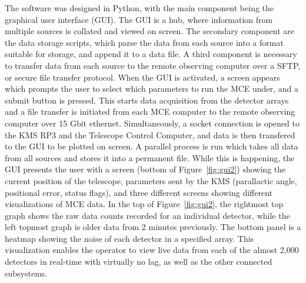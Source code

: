 \documentclass[manuscript]{aastex}
\begin{document}
The software was designed in {\sc Python}, with the main component being the graphical user interface (GUI). The GUI is a hub, where information from multiple sources is collated and viewed on screen. The secondary component are the data storage scripts, which parse the data from each source into a format suitable for storage, and append it to a data file. A third component is necessary to transfer data from each source to the remote observing computer over a {\sc SFTP}, or secure file transfer protocol. When the GUI is activated, a screen appears which prompts the user to select which parameters to run the MCE under, and a submit button is pressed. This starts data acquisition from the detector arrays and a file transfer is initiated from each MCE computer to the remote observing computer over 15 Gbit ethernet. Simultaneously, a socket connection is opened to the KMS RP3 and the Telescope Control Computer, and data is then transfered to the GUI to be plotted on screen. A parallel process is run which takes all data from all sources and stores it into a permanent file. While this is happening, the GUI presents the user with a screen (bottom of Figure~\ref{fig:gui2}) showing the current position of the telescope, parameters sent by the KMS (parallactic angle, positional error, status flags), and three different screens showing different visualizations of MCE data. In the top of Figure~\ref{fig:gui2}, the rightmost top graph shows the raw data counts recorded for an individual detector, while the left topmost graph is older data from 2 minutes previously. The bottom panel is a heatmap showing the noise of each detector in a specified array. This visualization enables the operator to view live data from each of the almost 2,000 detectors in real-time with virtually no lag, as well as the other connected subsystems. 
\end{document}

